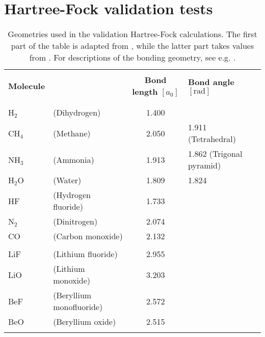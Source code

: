 \documentclass[../../master.tex]{subfiles}
\begin{document}
\renewcommand{\R}{{\bf R}}
\renewcommand{\r}{{\bf r}}
\newcommand{\p}{{\bf p}}
\newcommand{\q}{{\bf q}}
\renewcommand{\H}{\mathcal{H}}
\newcommand{\psit}{\left|\psi(t)\right\rangle}


\chapter{Hartree-Fock validation tests \label{hfvalid}}

\begin{table}
\setlength\extrarowheight{2pt}
\begin{tabularx}{\textwidth}{l X c l}
\hline
\hline
\\[-0.9em]
\textbf{Molecule} & & \textbf{Bond length} $[a_0]$ & \textbf{Bond angle} $[\text{rad}]$ \\
\\[-0.9em]
\hline
\\[-0.9em]
H${}_2$ & (Dihydrogen)   & 1.400 & \\
CH${}_4$ &(Methane)      & 2.050 & 1.911 (Tetrahedral)       \\
NH${}_3$ &(Ammonia)      & 1.913 & 1.862 (Trigonal pyramid)  \\
H${}_2$O &(Water)        & 1.809 & 1.824                     \\
HF &(Hydrogen fluoride)  & 1.733 & \\
N${}_2$ &(Dinitrogen)    & 2.074 & \\
CO &(Carbon monoxide)    & 2.132 & \\
\\[-0.0em]
LiF & (Lithium fluoride) & 2.955 & \\ %
LiO & (Lithium monoxide) & 3.203 & \\ %
BeF & (Beryllium monofluoride) & 2.572 & \\ %
BeO & (Beryllium oxide) & 2.515 & \\ %
\\[-0.9em]
\hline
\end{tabularx}
\caption{Geometries used in the validation Hartree-Fock calculations. The first part of the table is adapted from \cite{szabo}, while the latter part takes values from \cite{langhoff}. For descriptions of the bonding geometry, see e.g. \cite{zumdahl}. \label{tab:hfv1}}
\end{table}
\end{document}
